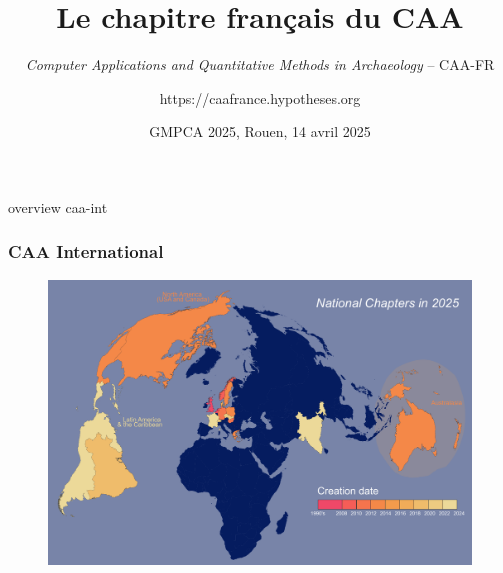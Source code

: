 \documentclass[t,aspectratio=169,xcolor=dvipsnames]{beamer}
\title[short title]{Le chapitre français du CAA}
\subtitle{\textit{Computer Applications and Quantitative Methods in Archaeology} -- CAA-FR}
\author{https://caafrance.hypotheses.org}
\date{\textcolor{nyublue}{GMPCA 2025, Rouen, 14 avril 2025}}
\begin{document}
\begin{frame}[plain]

    \titlepage
    
\end{frame}

\begin{frame}{overview caa-int}

    \frametitle{CAA International}


    \begin{figure}
        \includegraphics[height=0.92\textheight]{figures/national-chapters2025.pdf}
    \end{figure}

\end{frame}
\end{document}
